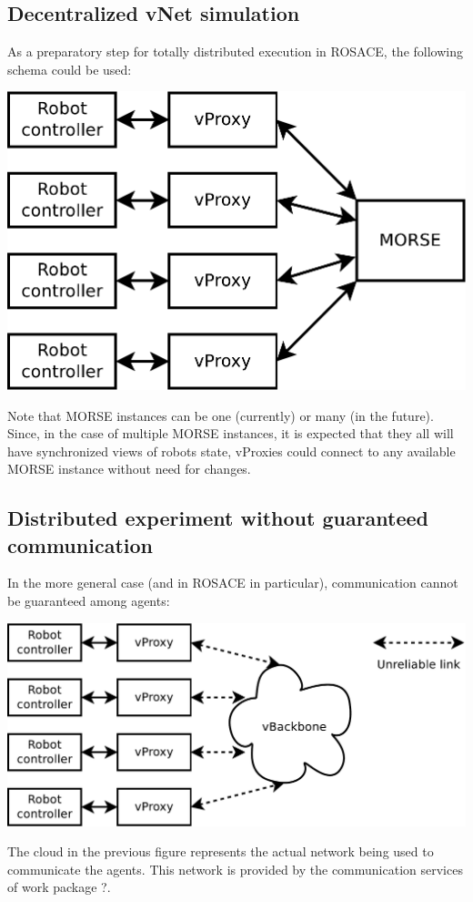 \documentclass[a4paper,11pt]{article}
\begin{document}
\subsection{Decentralized vNet simulation}

As a preparatory step for totally distributed execution in ROSACE, the following schema could be used:

\begin{center}
\includegraphics[width=0.666\columnwidth]{figures/distrib+morse}
\end{center}

Note that MORSE instances can be one (currently) or many (in the future). Since, in the case of multiple MORSE instances, it is expected that they all will have synchronized views of robots state, vProxies could connect to any available MORSE instance without need for changes.

\subsection{Distributed experiment without guaranteed communication}

In the more general case (and in ROSACE in particular), communication cannot be guaranteed among agents:

\begin{center}
\includegraphics[width=0.666\columnwidth]{figures/distrib}
\end{center}

The cloud in the previous figure represents the actual network being used to communicate the agents. This network is provided by the communication services of work package ?.
\end{document}
